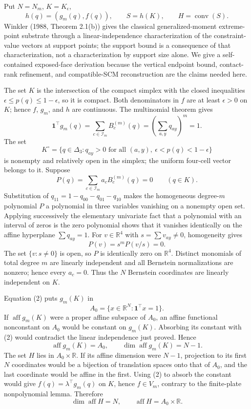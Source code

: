 Put \(N=N_m\), \(K=K_{\epsilon}\),
\[
 h(q)=(g_m(q),f(q)),\qquad S=h(K),\qquad H=\operatorname{conv}(S).
\tag{1}
\]
Winkler (1988, Theorem 2.1(b)) gives the classical generalized-moment extreme-point substrate through a linear-independence characterization of the constraint-value vectors at support points; the support bound is a consequence of that characterization, not a characterization by support size alone.  We give a self-contained exposed-face derivation because the vertical endpoint bound, contact-rank refinement, and compatible-SCM reconstruction are the claims needed here.

The set \(K\) is the intersection of the compact simplex with the closed inequalities \(\epsilon\leq p(q)\leq1-\epsilon\), so it is compact.  Both denominators in \(f\) are at least \(\epsilon>0\) on \(K\); hence \(f\), \(g_m\), and \(h\) are continuous.  The multinomial theorem gives
\[
 \mathbf 1^{\top}g_m(q)=\sum_{c\in\mathcal I_m}B_c^{(m)}(q)
 =\left(\sum_{a,y}q_{ay}\right)^m=1.
\tag{2}
\]
The set
\[
 K^{\circ}=\{q\in\Delta_3:q_{ay}>0\text{ for all }(a,y),\ \epsilon<p(q)<1-\epsilon\}
\tag{3}
\]
is nonempty and relatively open in the simplex; the uniform four-cell vector belongs to it.  Suppose
\[
 P(q)=\sum_{c\in\mathcal I_m}a_cB_c^{(m)}(q)=0\qquad(q\in K).
\tag{4}
\]
Substitution of \(q_{11}=1-q_{00}-q_{01}-q_{10}\) makes the homogeneous degree-\(m\) polynomial \(P\) a polynomial in three variables vanishing on a nonempty open set.  Applying successively the elementary univariate fact that a polynomial with an interval of zeros is the zero polynomial shows that it vanishes identically on the affine hyperplane \(\sum q_{ay}=1\).  For \(v\in\mathbb R^4\) with \(s=\sum v_{ay}\neq0\), homogeneity gives
\[
 P(v)=s^mP(v/s)=0.
\tag{5}
\]
The set \(\{v:s\neq0\}\) is open, so \(P\) is identically zero on \(\mathbb R^4\).  Distinct monomials of total degree \(m\) are linearly independent and all Bernstein normalizations are nonzero; hence every \(a_c=0\).  Thus the \(N\) Bernstein coordinates are linearly independent on \(K\).

Equation (2) puts \(g_m(K)\) in
\[
 A_0=\{x\in\mathbb R^N:\mathbf1^{\top}x=1\}.
\tag{6}
\]
If \(\operatorname{aff}g_m(K)\) were a proper affine subspace of \(A_0\), an affine functional nonconstant on \(A_0\) would be constant on \(g_m(K)\).  Absorbing its constant with (2) would contradict the linear independence just proved.  Hence
\[
 \operatorname{aff}g_m(K)=A_0,
 \qquad \dim\operatorname{aff}g_m(K)=N-1.
\tag{7}
\]
The set \(H\) lies in \(A_0\times\mathbb R\).  If its affine dimension were \(N-1\), projection to its first \(N\) coordinates would be a bijection of translation spaces onto that of \(A_0\), and the last coordinate would be affine in the first.  Using (2) to absorb the constant would give \(f(q)=\lambda^{\top}g_m(q)\) on \(K\), hence \(f\in V_m\), contrary to the finite-plate nonpolynomial lemma.  Therefore
\[
 \dim\operatorname{aff}H=N,
 \qquad \operatorname{aff}H=A_0\times\mathbb R.
\tag{8}
\]


